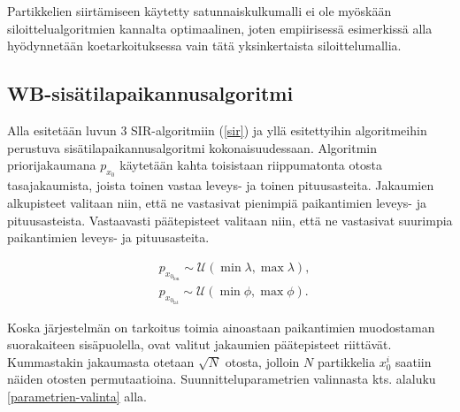 \documentclass[
  12pt,
  a4paper, twoside]{book}
\begin{document}
Partikkelien siirtämiseen käytetty satunnaiskulkumalli ei ole myöskään siloittelualgoritmien kannalta optimaalinen, joten empiirisessä esimerkissä alla hyödynnetään koetarkoituksessa vain tätä yksinkertaista siloittelumallia.

\subsection{WB-sisätilapaikannusalgoritmi}

Alla esitetään luvun 3 SIR-algoritmiin (\ref{sir}) ja yllä esitettyihin algoritmeihin perustuva sisätilapaikannusalgoritmi kokonaisuudessaan. Algoritmin priorijakaumana \(p_{x_0}\) käytetään kahta toisistaan riippumatonta otosta tasajakaumista, joista toinen vastaa leveys- ja toinen pituusasteita. Jakaumien alkupisteet valitaan niin, että ne vastasivat pienimpiä paikantimien leveys- ja pituusasteista. Vastaavasti päätepisteet valitaan niin, että ne vastasivat suurimpia paikantimien leveys- ja pituusasteita.

\begin{align} \label{priorijakauma}
&p_{x_{0_{\text{lon}}}}\sim\mathcal{U}(\min{\lambda},\max{\lambda}),\\
&p_{x_{0_{\text{lat}}}}\sim\mathcal{U}(\min{\phi},\max{\phi}).
\end{align}

\noindent Koska järjestelmän on tarkoitus toimia ainoastaan paikantimien muodostaman suorakaiteen sisäpuolella, ovat valitut jakaumien päätepisteet riittävät. Kummastakin jakaumasta otetaan \(\sqrt{N}\) otosta, jolloin \(N\) partikkelia \(x^i_0\) saatiin näiden otosten permutaatioina. Suunnitteluparametrien valinnasta kts. alaluku \ref{parametrien-valinta} alla.
\end{document}
